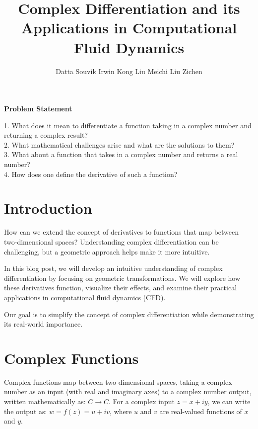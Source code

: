 \documentclass[a4paper,10.5pt]{article}
\title{Complex Differentiation and its Applications in Computational Fluid Dynamics}
\author{Datta Souvik \quad Irwin Kong \quad Liu Meichi \quad Liu Zichen}
\date{}
\begin{document}
\maketitle

\vspace{-1cm}
\begin{tcolorbox}[colframe=black, colback=gray!10, sharp corners=south]
\textbf{Problem Statement}
\vspace{0.2cm}

1. What does it mean to differentiate a function taking in a complex number and returning a complex result? \\
2. What mathematical challenges arise and what are the solutions to them? \\
3. What about a function that takes in a complex number and returns a real number? \\
4. How does one define the derivative of such a function?
\end{tcolorbox}

\section{Introduction}
How can we extend the concept of derivatives to functions that map between two-dimensional spaces? Understanding complex differentiation can be challenging, but a geometric approach helps make it more intuitive.

\vspace{0.25cm}
In this blog post, we will develop an intuitive understanding of complex differentiation by focusing on geometric transformations. We will explore how these derivatives function, visualize their effects, and examine their practical applications in computational fluid dynamics (CFD).
\vspace{0.25cm}

Our goal is to simplify the concept of complex differentiation while demonstrating its real-world importance.

\section{Complex Functions}
Complex functions map between two-dimensional spaces, taking a complex number as an input (with real and imaginary axes) to a complex number output, written mathematically as: $C \rightarrow C$. For a complex input $z = x + iy$, we can write the output as: $w = f(z) = u + iv$, where $u$ and $v$ are real-valued functions of $x$ and $y$.
\end{document}
